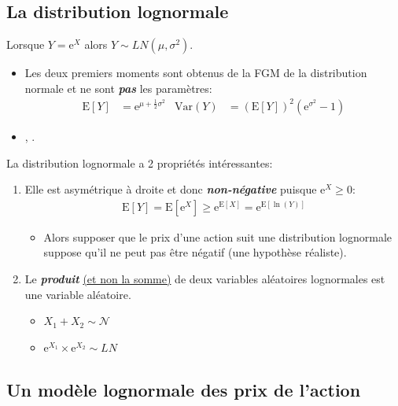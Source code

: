 \documentclass[10pt, french]{article}
\begin{document}
\begin{multicols*}{2}
\subsection{La distribution lognormale}
Lorsque $Y = \textrm{e}^{X}$ alors $Y \sim LN(\mu,\sigma^{2})$.

\begin{itemize}
	\item	Les deux premiers moments sont obtenus de la FGM de la distribution normale et ne sont \textbf{\textit{pas}} les paramètres:
		\begin{align*}
		\text{E}[Y]
		&=	\textrm{e}^{\mu + \frac{1}{2}\sigma^{2}}	&
		\text{Var}(Y)
		&=	\left(\text{E}[Y]\right)^{2} \left(\textrm{e}^{\sigma^{2}} - 1\right)	
		\end{align*}
	\item	{}, .
\end{itemize}

La distribution lognormale a 2 propriétés intéressantes:
\begin{enumerate}
	\item	Elle est asymétrique à droite et donc \textbf{\textit{non-négative}} puisque $\textrm{e}^{X} \ge 0$:
		\begin{align*}
		\text{E}[Y]
		=	\text{E}[\textrm{e}^{X}]
		\geq
		\textrm{e}^{\text{E}[X]}
		=	\textrm{e}^{\text{E}[\ln(Y)]}
		\end{align*}
		\begin{itemize}
		\item	Alors supposer que le prix d'une action suit une distribution lognormale suppose qu'il ne peut pas être négatif (une hypothèse réaliste).
		\end{itemize}
	\item	Le \textit{\textbf{produit}} \underline{(et non la somme)} de deux variables aléatoires lognormales est une variable aléatoire.
		\begin{itemize}
		\item	$X_{1} + X_{2} \sim \mathcal{N}$
		\item	$\textrm{e}^{X_{1}} 	\times \textrm{e}^{X_{2}} \sim LN$
		\end{itemize}
\end{enumerate}


\columnbreak
\subsection*{Un modèle lognormale des prix de l'action}

\end{multicols*}
\end{document}
